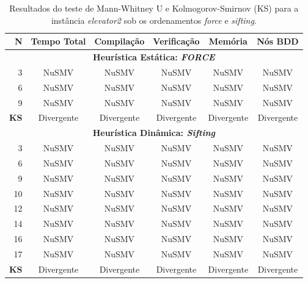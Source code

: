 \documentclass[cic,tc]{infufrgs}
\begin{document}
	\begin{table}[htbp]
		\centering
		\caption{Resultados do teste de Mann-Whitney U e Kolmogorov-Smirnov (KS) para a instância \textit{elevator2} sob os ordenamentos \textit{force} e \textit{sifting}.}
		\label{tab:estatistica_unificada_elevator2_heuristics}
		\small 
		\begin{tabular}{rccccc}
			\toprule
			\textbf{N} & \textbf{Tempo Total} & \textbf{Compilação} & \textbf{Verificação} & \textbf{Memória} & \textbf{Nós BDD} \\
			\midrule
			\multicolumn{6}{c}{\textbf{Heurística Estática: \textit{FORCE}}} \\
			\midrule
			3  & NuSMV          & NuSMV        & NuSMV          & NuSMV          & NuSMV          \\
			6  & NuSMV          & NuSMV        & NuSMV          & NuSMV          & NuSMV          \\
			9  & NuSMV          & NuSMV        & NuSMV          & NuSMV          & NuSMV          \\
			\midrule
			\textbf{KS} & Divergente & Divergente & Divergente & Divergente & Divergente \\
			\midrule
			\multicolumn{6}{c}{\textbf{Heurística Dinâmica: \textit{Sifting}}} \\
			\midrule
			3  & NuSMV          & NuSMV        & NuSMV          & NuSMV          & NuSMV          \\
			6  & NuSMV          & NuSMV        & NuSMV          & NuSMV          & NuSMV          \\
			9  & NuSMV          & NuSMV        & NuSMV          & NuSMV          & NuSMV          \\
			10 & NuSMV          & NuSMV        & NuSMV          & NuSMV          & NuSMV          \\
			12 & NuSMV          & NuSMV        & NuSMV          & NuSMV          & NuSMV          \\
			14 & NuSMV          & NuSMV        & NuSMV          & NuSMV          & NuSMV          \\
			16 & NuSMV          & NuSMV        & NuSMV          & NuSMV          & NuSMV          \\
			17 & NuSMV          & NuSMV        & NuSMV          & NuSMV          & NuSMV          \\
			\midrule
			\textbf{KS} & Divergente & Divergente & Divergente & Divergente & Divergente \\
			\bottomrule
		\end{tabular}
	\end{table}
	
\end{document}
